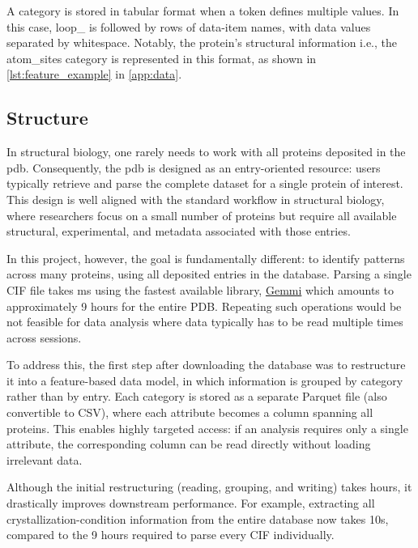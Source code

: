 A category is stored in tabular format when a token defines multiple values. In this case, loop\_ is followed by rows of data-item names, with data values separated by whitespace. Notably, the protein’s structural information i.e., the atom\_sites category is represented in this format, as shown in \autoref{lst:feature_example} in \autoref{app:data}.

\subsection*{Structure}\label{sec:protein_database/structure}

In structural biology, one rarely needs to work with all proteins deposited in the \gls{pdb}. Consequently, the \gls{pdb} is designed as an entry-oriented resource: users typically retrieve and parse the complete dataset for a single protein of interest. This design is well aligned with the standard workflow in structural biology, where researchers focus on a small number of proteins but require all available structural, experimental, and metadata associated with those entries.

In this project, however, the goal is fundamentally different: to identify patterns across many proteins, using all deposited entries in the database. Parsing a single CIF file takes  ms using the fastest available library, \href{https://gemmi.readthedocs.io/en/latest/index.html}{Gemmi} which amounts to approximately 9 hours for the entire PDB. Repeating such operations would be not feasible for data analysis where data typically has to be read multiple times across sessions.

To address this, the first step after downloading the database was to restructure it into a feature-based data model, in which information is grouped by category rather than by entry. Each category is stored as a separate Parquet file (also convertible to CSV), where each attribute becomes a column spanning all proteins. This enables highly targeted access: if an analysis requires only a single attribute, the corresponding column can be read directly without loading irrelevant data.

Although the initial restructuring (reading, grouping, and writing) takes  hours, it drastically improves downstream performance. For example, extracting all crystallization-condition information from the entire database now takes \roughly 10s, compared to the 9 hours required to parse every CIF individually.

